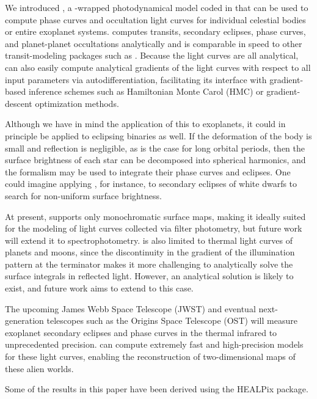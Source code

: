 \documentclass[modern]{aastex61}
\begin{document}
We introduced \starry, a \Python-wrapped photodynamical model coded in \cpp
that can be used to compute phase curves and occultation light curves for
individual celestial bodies or entire exoplanet systems. \starry computes
transits, secondary eclipses, phase curves, and planet-planet occultations
analytically and is comparable in speed to other transit-modeling packages such
as \batman \citep{Kreidberg2015}. Because the light curves are all analytical,
\starry can also easily compute analytical gradients of the light curves with respect
to all input parameters via autodifferentiation, facilitating its interface with
gradient-based inference schemes such as Hamiltonian Monte Carol (HMC)
or gradient-descent optimization methods.

Although we have in mind the application of this \starry to exoplanets, it could
in principle be applied to eclipsing binaries as well.  If the deformation of
the body is small and reflection is negligible, as is the case for long orbital periods,
then the surface brightness of each star can be decomposed into spherical harmonics,
and the \starry formalism may be used to integrate their phase curves and eclipses.
One could imagine applying \starry, for instance, to secondary eclipses of white
dwarfs to search for non-uniform surface brightness.

At present, \starry supports only
monochromatic surface maps, making it ideally suited for the modeling of
light curves collected via filter photometry, but future work will extend
it to spectrophotometry. \starry is also limited to thermal light curves of
planets and moons, since the discontinuity in the gradient of the
illumination pattern at the terminator makes it more challenging to analytically
solve the surface integrals in reflected light. However, an analytical solution
is likely to exist, and future work aims to extend \starry to this case.

The upcoming James Webb Space Telescope (JWST) and eventual
next-generation telescopes such as the Origins Space Telescope (OST) will
measure exoplanet secondary eclipses and
phase curves in the thermal infrared to unprecedented precision. \starry
can compute extremely fast and high-precision models for these
light curves, enabling the reconstruction of two-dimensional maps of these
alien worlds.


\acknowledgments
Some of the results in this paper have been derived using the HEALPix
\citep{Gorski2005} package.

%

%
\end{document}
